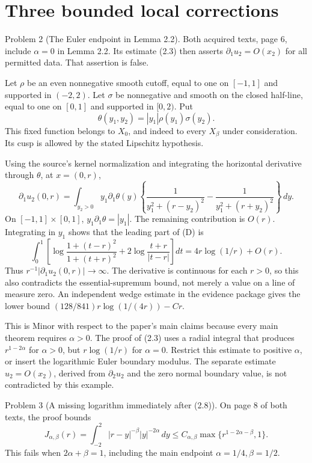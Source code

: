 \documentclass[10pt]{article}
\begin{document}
\section*{Three bounded local corrections}
Problem 2 (The Euler endpoint in Lemma 2.2).  Both acquired texts, page 6, include \(\alpha=0\) in Lemma 2.2. Its estimate (2.3) then asserts \(\partial_1u_2=O(x_2)\) for all permitted data. That assertion is false.\par
Let \(\rho\) be an even nonnegative smooth cutoff, equal to one on \([-1,1]\) and supported in \((-2,2)\). Let \(\sigma\) be nonnegative and smooth on the closed half-line, equal to one on \([0,1]\) and supported in \([0,2)\). Put \[\theta(y_1,y_2)=|y_1|\rho(y_1)\sigma(y_2).\] This fixed function belongs to \(X_0\), and indeed to every \(X_\beta\) under consideration. Its cusp is allowed by the stated Lipschitz hypothesis.\par
Using the source’s kernel normalization and integrating the horizontal derivative through \(\theta\), at \(x=(0,r)\), \[\partial_1u_2(0,r)
 =\int_{y_2>0}y_1\partial_1\theta(y)
 \left\{\frac1{y_1^2+(r-y_2)^2}
        -\frac1{y_1^2+(r+y_2)^2}\right\}\,dy.
 \tag{D}\] On \([-1,1]\times[0,1]\), \(y_1\partial_1\theta=|y_1|\). The remaining contribution is \(O(r)\). Integrating in \(y_1\) shows that the leading part of (D) is \[\int_0^1\left[
 \log\frac{1+(t-r)^2}{1+(t+r)^2}
       +2\log\frac{t+r}{|t-r|}\right]dt
 =4r\log(1/r)+O(r).\] Thus \(r^{-1}|\partial_1u_2(0,r)|\to\infty\). The derivative is continuous for each \(r>0\), so this also contradicts the essential-supremum bound, not merely a value on a line of measure zero. An independent wedge estimate in the evidence package gives the lower bound \((128/841)r\log(1/(4r))-Cr\).\par
This is Minor with respect to the paper’s main claims because every main theorem requires \(\alpha>0\). The proof of (2.3) uses a radial integral that produces \(r^{1-2\alpha}\) for \(\alpha>0\), but \(r\log(1/r)\) for \(\alpha=0\). Restrict this estimate to positive \(\alpha\), or insert the logarithmic Euler boundary modulus. The separate estimate \(u_2=O(x_2)\), derived from \(\partial_2u_2\) and the zero normal boundary value, is not contradicted by this example.\par
Problem 3 (A missing logarithm immediately after (2.8)).  On page 8 of both texts, the proof bounds \[J_{\alpha,\beta}(r)
 =\int_{-2}^{2}|r-y|^{-\beta}|y|^{-2\alpha}\,dy
 \le C_{\alpha,\beta}\max\{r^{1-2\alpha-\beta},1\}.
 \tag{E}\] This fails when \(2\alpha+\beta=1\), including the main endpoint \(\alpha=1/4,\beta=1/2\).\par
\end{document}
